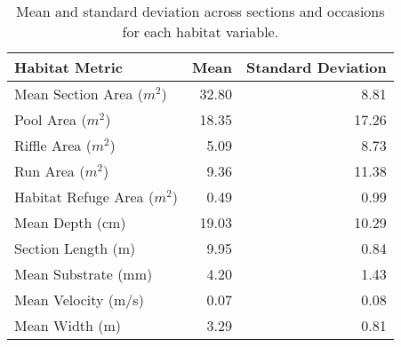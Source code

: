\begin{table}[ht]
\centering
\caption{Mean and standard deviation across sections and occasions for each habitat variable.} 
\label{tab:habitat}
\begin{tabular}{lrr}
  \hline
Habitat Metric & Mean & Standard Deviation \\ 
  \hline
Mean Section Area ($m^2$) & 32.80 & 8.81 \\ 
  Pool Area ($m^2$) & 18.35 & 17.26 \\ 
  Riffle Area ($m^2$) & 5.09 & 8.73 \\ 
  Run Area ($m^2$) & 9.36 & 11.38 \\ 
  Habitat Refuge Area ($m^2$) & 0.49 & 0.99 \\ 
  Mean Depth (cm) & 19.03 & 10.29 \\ 
  Section Length (m) & 9.95 & 0.84 \\ 
  Mean Substrate (mm) & 4.20 & 1.43 \\ 
  Mean Velocity (m/s) & 0.07 & 0.08 \\ 
  Mean Width (m) & 3.29 & 0.81 \\ 
   \hline
\end{tabular}
\end{table}
